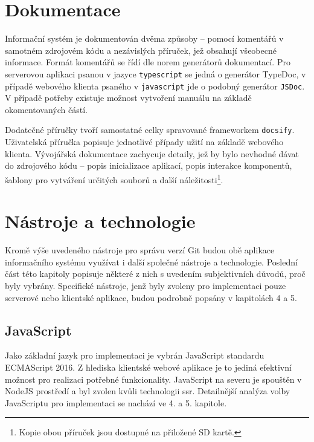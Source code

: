 

\section{Dokumentace}

Informační systém je dokumentován dvěma způsoby -- pomocí komentářů v samotném zdrojovém kódu a nezávislých příruček, jež obsahují všeobecné informace. Formát komentářů se řídí dle norem generátorů dokumentací. Pro serverovou aplikaci psanou v jazyce \texttt{typescript} se jedná o generátor TypeDoc, v případě webového klienta psaného v \texttt{javascript} jde o podobný generátor \texttt{JSDoc}. V případě potřeby existuje možnost vytvoření manuálu na základě okomentovaných částí.

Dodatečné příručky tvoří samostatné celky spravované frameworkem \texttt{docsify}. Uživatelská příručka popisuje jednotlivé případy užití na základě webového klienta. Vývojářská dokumentace zachycuje detaily, jež by bylo nevhodné dávat do zdrojového kódu -- popis inicializace aplikací, popis interakce komponentů, šablony pro vytváření určitých souborů a další náležitosti\footnote{Kopie obou příruček jsou dostupné na přiložené SD kartě.}.




\section{Nástroje a technologie}

Kromě výše uvedeného nástroje pro správu verzí Git budou obě aplikace informačního systému využívat i další společné nástroje a technologie. Poslední část této kapitoly popisuje některé z nich s uvedením subjektivních důvodů, proč byly vybrány. Specifické nástroje, jenž byly zvoleny pro implementaci pouze serverové nebo klientské aplikace, budou podrobně popsány v kapitolách 4 a 5. 

\subsection{JavaScript}
Jako základní jazyk pro implementaci je vybrán JavaScript standardu ECMAScript 2016. Z hlediska klientské webové aplikace je to jediná efektivní možnost pro realizaci potřebné funkcionality. JavaScript na severu je spouštěn v NodeJS prostředí a byl zvolen kvůli technologii \gls{ssr}. Detailnější analýza volby JavaScriptu pro implementaci se nachází ve 4. a 5. kapitole.

